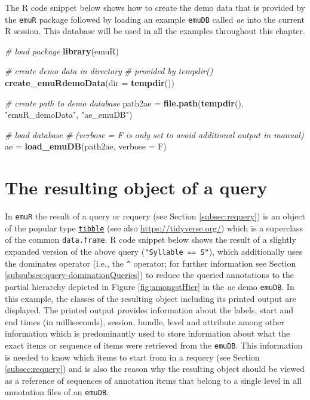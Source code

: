 \documentclass[]{book}
\newenvironment{Shaded}{\begin{snugshade}}{\end{snugshade}}
\newcommand{\CommentTok}[1]{\textcolor[rgb]{0.56,0.35,0.01}{\textit{#1}}}
\newcommand{\DataTypeTok}[1]{\textcolor[rgb]{0.13,0.29,0.53}{#1}}
\newcommand{\KeywordTok}[1]{\textcolor[rgb]{0.13,0.29,0.53}{\textbf{#1}}}
\newcommand{\NormalTok}[1]{#1}
\newcommand{\StringTok}[1]{\textcolor[rgb]{0.31,0.60,0.02}{#1}}
\begin{document}
The R code snippet below shows how to create the demo data that is provided by the \texttt{emuR} package followed by loading an example \texttt{emuDB} called \emph{ae} into the current R session. This database will be used in all the examples throughout this chapter.

\begin{Shaded}
\begin{Highlighting}[]
\CommentTok{# load package}
\KeywordTok{library}\NormalTok{(emuR)}

\CommentTok{# create demo data in directory}
\CommentTok{# provided by tempdir()}
\KeywordTok{create_emuRdemoData}\NormalTok{(}\DataTypeTok{dir =} \KeywordTok{tempdir}\NormalTok{())}

\CommentTok{# create path to demo database}
\NormalTok{path2ae =}\StringTok{ }\KeywordTok{file.path}\NormalTok{(}\KeywordTok{tempdir}\NormalTok{(), }\StringTok{"emuR_demoData"}\NormalTok{, }\StringTok{"ae_emuDB"}\NormalTok{)}

\CommentTok{# load database}
\CommentTok{# (verbose = F is only set to avoid additional output in manual)}
\NormalTok{ae =}\StringTok{ }\KeywordTok{load_emuDB}\NormalTok{(path2ae, }\DataTypeTok{verbose =}\NormalTok{ F)}
\end{Highlighting}
\end{Shaded}

\hypertarget{sec:query-emuRsegs}{%
\section{The resulting object of a query}\label{sec:query-emuRsegs}}

In \texttt{emuR} the result of a query or requery (see Section \ref{subsec:requery}) is an object of the popular type \href{https://tibble.tidyverse.org/}{\texttt{tibble}} (see also \url{https://tidyverse.org/}) which is a superclass of the common \texttt{data.frame}. R code snippet below shows the result of a slightly expanded version of the above query (\texttt{"Syllable\ ==\ S"}), which additionally uses the dominates operator (i.e., the \texttt{\^{}} operator; for further information see Section \ref{subsubsec:query-dominationQueries}) to reduce the queried annotations to the partial hierarchy depicted in Figure \ref{fig:amongstHier} in the \emph{ae} demo \texttt{emuDB}. In this example, the classes of the resulting object including its printed output are displayed. The printed output provides information about the labels, start and end times (in milliseconds), session, bundle, level and attribute among other information which is predominantly used to store information about what the exact items or sequence of items were retrieved from the \texttt{emuDB}. This information is needed to know which items to start from in a requery (see Section \ref{subsec:requery}) and is also the reason why the resulting object should be viewed as a reference of sequences of annotation items that belong to a single level in all annotation files of an \texttt{emuDB}.
\end{document}
